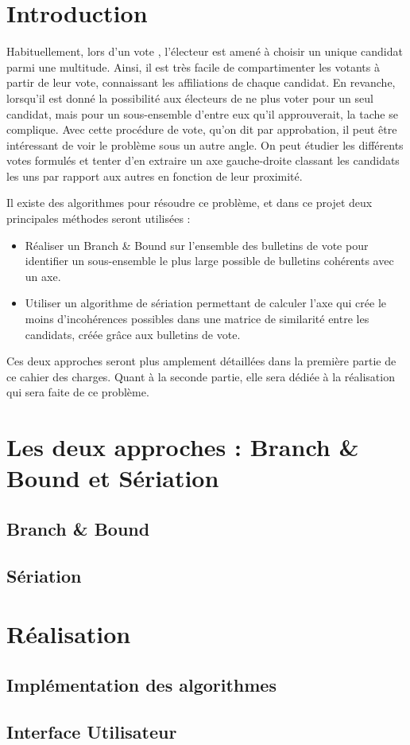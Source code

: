 \documentclass[12pt]{article}
\begin{document}
\section*{Introduction}
Habituellement, lors d'un vote , l'électeur est amené à choisir un unique candidat parmi une multitude. Ainsi, il est très facile de compartimenter les votants à partir de leur vote, connaissant les affiliations de chaque candidat. En revanche, lorsqu'il est donné la possibilité aux électeurs de ne plus voter pour un seul candidat, mais pour un sous-ensemble d'entre eux qu'il approuverait, la tache se complique. Avec cette procédure de vote, qu'on dit par approbation, il peut être intéressant de voir le problème sous un autre angle. On peut étudier les différents votes formulés et tenter d'en extraire un axe \og gauche-droite \fg{} classant les candidats les uns par rapport aux autres en fonction de leur proximité.

Il existe des algorithmes pour résoudre ce problème, et dans ce projet deux principales méthodes seront utilisées :
\begin{itemize}
	\item Réaliser un \og Branch \& Bound \fg{} sur l'ensemble des bulletins de vote pour identifier un sous-ensemble le plus large possible de bulletins cohérents avec un axe.
	\item Utiliser un algorithme de sériation permettant de calculer l'axe qui crée le moins d'incohérences possibles dans une matrice de similarité entre les candidats, créée grâce aux bulletins de vote.
\end{itemize}

Ces deux approches seront plus amplement détaillées dans la première partie de ce cahier des charges. Quant à la seconde partie, elle sera dédiée à la réalisation qui sera faite de ce problème.

\section{Les deux approches : Branch \& Bound et S\'{e}riation}


\subsection{Branch \& Bound}

\subsection{S\'{e}riation}

\section{R\'{e}alisation}

\subsection{Implémentation des algorithmes}

\subsection{Interface Utilisateur}
\end{document}

